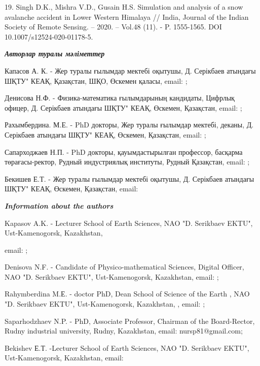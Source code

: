 19. Singh D.K., Mishra V.D., Gusain H.S. Simulation and analysis of a
snow avalanche accident in Lower Western Himalaya // India, Journal of
the Indian Society of Remote Sensing. -- 2020. -- Vol.48 (11). - P.
1555-1565. DOI 10.1007/s12524-020-01178-5.

\emph{{\bfseries Авторлар туралы мәліметтер}}

Капасов А. К. - Жер туралы ғылымдар мектебі оқытушы, Д. Серікбаев
атындағы ШҚТУ" КЕАҚ, Қазақстан, ШҚО, Өскемен қаласы, email:
\href{mailto:AKapasov@edu.ektu.kz}{};

Денисова Н.Ф. - Физика-математика ғылымдарының кандидаты, Цифрлық
офицер, Д. Серікбаев атындағы ШҚТУ" КЕАҚ, Өскемен, Қазақстан, email:
\href{mailto:NDenisova@ektu.kz}{};

Рахымбердина. М.Е. - PhD докторы, Жер туралы ғылымдар мектебі, деканы,
Д. Серікбаев атындағы ШҚТУ" КЕАҚ, Өскемен, Қазақстан, email:
\href{mailto:MRahymberdina@edu.ektu.kz}{};

Сапарходжаев Н.П. - PhD докторы, қауымдастырылған профессор, басқарма
төрағасы-ректор, Рудный индустриялық институты, Рудный Қазақстан, email:
\href{mailto:nursp81@gmail.com}{};

Бекишев Е.Т. - Жер туралы ғылымдар мектебі оқытушы, Д. Серікбаев
атындағы ШҚТУ" КЕАҚ, Өскемен, Қазақстан, email:
\href{mailto:YBekishev@edu.ektu.kz}{}

\emph{{\bfseries Information about the authors}}

Kapasov A.K. - Lecturer School of Earth Sciences, NAO "D. Serikbaev
EKTU", Ust-Kamenogorsk, Kazakhstan,

email: \href{mailto:AKapasov@edu.ektu.kz}{};

Denisova N.F. - Candidate of Physico-mathematical Sciences, Digital
Officer, NAO "D. Serikbaev EKTU", Ust-Kamenogorsk, Kazakhstan, email:
\href{mailto:NDenisova@ektu.kz}{};

Rahymberdina M.Е. - doctor PhD, Dean School of Science of the Earth ,
NAO "D. Serikbaev EKTU", Ust-Kamenogorsk, Kazakhstan, , email:
\href{mailto:MRahymberdina@edu.ektu.kz}{};

Saparhodzhaev N.P. - PhD, Associate Professor, Chairman of the
Board-Rector, Rudny industrial university, Rudny, Kazakhstan, email:
nursp81@gmail.com;

Bekishev Е.Т. -Lecturer School of Earth Sciences, NAO "D. Serikbaev
EKTU", Ust-Kamenogorsk, Kazakhstan, email:\